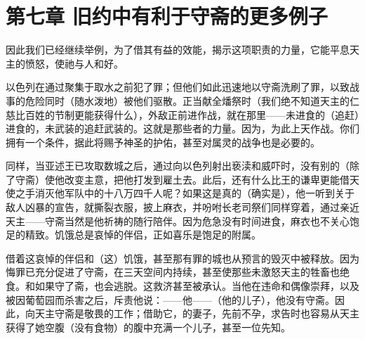 
\section{第七章 旧约中有利于守斋的更多例子}

因此我们已经继续举例，为了借其有益的效能，揭示这项职责的力量，它能平息天主的愤怒，使祂与人和好。\par

以色列在通过聚集于取水之前犯了罪；但他们如此迅速地以守斋洗刷了罪，以致战事的危险同时（随水泼地）被他们驱散。正当献全燔祭时（我们绝不知道天主的仁慈比百姓的节制更能获得什么），外敌正前进作战，就在那里——未进食的（追赶）进食的，未武装的追赶武装的。这就是那些者的力量。因为，为此上天作战。你们拥有一个条件，据此将赐予神圣的护佑，甚至对属灵的战争也是必要的。\par

同样，当亚述王已攻取数城之后，通过向以色列射出亵渎和威吓时，没有别的（除了守斋）使他改变主意，把他打发到雇土去。此后，还有什么比王的谦卑更能借天使之手消灭他军队中的十八万四千人呢？如果这是真的（确实是），他一听到关于敌人凶暴的宣告，就撕裂衣服，披上麻衣，并吩咐长老司祭们同样穿着，通过亲近天主——守斋当然是他祈祷的随行陪伴。因为危急没有时间进食，麻衣也不关心饱足的精致。饥饿总是哀悼的伴侣，正如喜乐是饱足的附属。\par

借着这哀悼的伴侣和（这）饥饿，甚至那有罪的城也从预言的毁灭中被释放。因为悔罪已充分促进了守斋，在三天空间内持续，甚至使那些未激怒天主的牲畜也绝食。和如果守了斋，也会逃脱。这救济甚至被承认。当他在违命和偶像崇拜，以及被因葡萄园而杀害之后，斥责他说：——他——（他的儿子），他没有守斋。因此，向天主守斋是敬畏的工作；借助它，的妻子，先前不孕，求告时也容易从天主获得了她空腹（没有食物）的腹中充满一个儿子，甚至一位先知。\par

